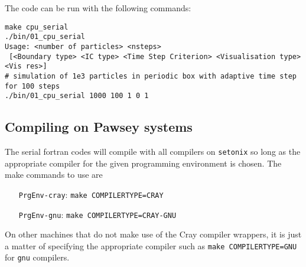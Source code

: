 \par 
The code can be run with the following commands: 
\begin{center}
\begin{minipage}{0.95\textwidth}
\small
\begin{verbatim}
make cpu_serial
./bin/01_cpu_serial 
Usage: <number of particles> <nsteps>
 [<Boundary type> <IC type> <Time Step Criterion> <Visualisation type> <Vis res>]
# simulation of 1e3 particles in periodic box with adaptive time step for 100 steps  
./bin/01_cpu_serial 1000 100 1 0 1  
\end{verbatim}
\end{minipage}
\end{center}

\subsection{Compiling on Pawsey systems}
The serial fortran codes will compile with all compilers on \texttt{setonix} so long as the appropriate compiler for the given programming environment is chosen. The make commands to use are 
\begin{itemize}
    \setlength{\itemindent}{70pt}
    \item[\texttt{PrgEnv-cray}:\quad]{\texttt{make COMPILERTYPE=CRAY}}
    \item[\texttt{PrgEnv-gnu}:\quad]{\texttt{make COMPILERTYPE=CRAY-GNU}}
\end{itemize}
On other machines that do not make use of the Cray compiler wrappers, it is just a matter of specifying the appropriate compiler such as \texttt{make COMPILERTYPE=GNU} for \texttt{gnu} compilers.
